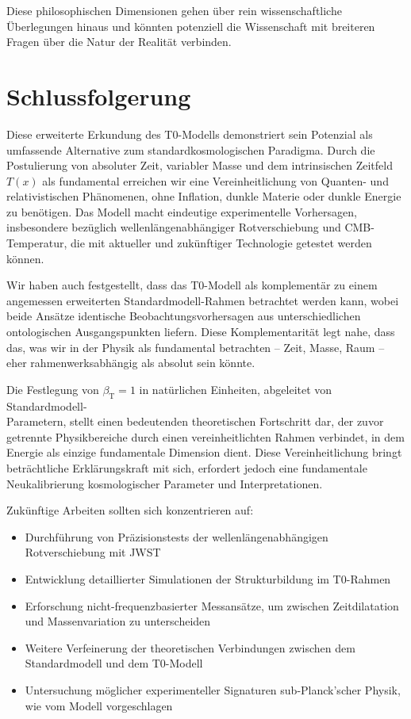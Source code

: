 \documentclass[12pt,a4paper]{article}
\newcommand{\Tfield}{T(x)}
\newcommand{\betaT}{\beta_{\text{T}}}
\begin{document}
	Diese philosophischen Dimensionen gehen über rein wissenschaftliche Überlegungen hinaus und könnten potenziell die Wissenschaft mit breiteren Fragen über die Natur der Realität verbinden.
	
	\section{Schlussfolgerung}
	\label{sec:conclusion}
	
	Diese erweiterte Erkundung des T0-Modells demonstriert sein Potenzial als umfassende Alternative zum standardkosmologischen Paradigma. Durch die Postulierung von absoluter Zeit, variabler Masse und dem intrinsischen Zeitfeld \(\Tfield\) als fundamental erreichen wir eine Vereinheitlichung von Quanten- und relativistischen Phänomenen, ohne Inflation, dunkle Materie oder dunkle Energie zu benötigen. Das Modell macht eindeutige experimentelle Vorhersagen, insbesondere bezüglich wellenlängenabhängiger Rotverschiebung und CMB-Temperatur, die mit aktueller und zukünftiger Technologie getestet werden können.
	
	Wir haben auch festgestellt, dass das T0-Modell als komplementär zu einem angemessen erweiterten Standardmodell-Rahmen betrachtet werden kann, wobei beide Ansätze identische Beobachtungsvorhersagen aus unterschiedlichen ontologischen Ausgangspunkten liefern. Diese Komplementarität legt nahe, dass das, was wir in der Physik als fundamental betrachten – Zeit, Masse, Raum – eher rahmenwerksabhängig als absolut sein könnte.
	
	Die Festlegung von \(\betaT = 1\) in natürlichen Einheiten, abgeleitet von Standardmodell-\\Parametern, stellt einen bedeutenden theoretischen Fortschritt dar, der zuvor getrennte Physikbereiche durch einen vereinheitlichten Rahmen verbindet, in dem Energie als einzige fundamentale Dimension dient. Diese Vereinheitlichung bringt beträchtliche Erklärungskraft mit sich, erfordert jedoch eine fundamentale Neukalibrierung kosmologischer Parameter und Interpretationen.
	
	Zukünftige Arbeiten sollten sich konzentrieren auf:
	\begin{itemize}
		\item Durchführung von Präzisionstests der wellenlängenabhängigen Rotverschiebung mit JWST
		\item Entwicklung detaillierter Simulationen der Strukturbildung im T0-Rahmen
		\item Erforschung nicht-frequenzbasierter Messansätze, um zwischen Zeitdilatation und Massenvariation zu unterscheiden
		\item Weitere Verfeinerung der theoretischen Verbindungen zwischen dem Standardmodell und dem T0-Modell
		\item Untersuchung möglicher experimenteller Signaturen sub-Planck'scher Physik, wie vom Modell vorgeschlagen
	\end{itemize}
	
\end{document}
